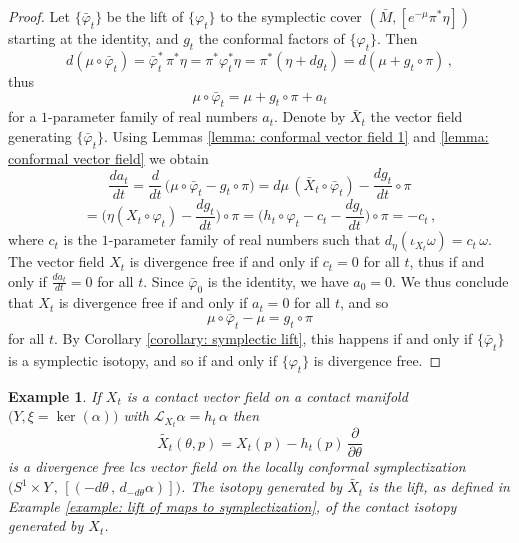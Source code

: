 \documentclass{amsart}
\newtheorem{example}[thm]{Example}
\theoremstyle{remark}
\begin{document}
\begin{proof}
Let $\{\bar{\varphi}_t\}$ be the lift of $\{\varphi_t\}$
to the symplectic cover $(\bar{M}, [e^{-\mu} \pi^{\ast}\eta])$
starting at the identity,
and $g_t$ the conformal factors of $\{\varphi_t\}$.
Then
\[
d (\mu \circ \bar{\varphi}_t)
= \bar{\varphi}_t^{\ast} \, \pi^{\ast} \eta
= \pi^{\ast} \varphi_t^{\ast} \eta
= \pi^{\ast} (\eta + dg_t)
= d (\mu + g_t \circ \pi) \,,
\]
thus
\[
\mu \circ \bar{\varphi}_t = \mu + g_t \circ \pi + a_t
\]
for a $1$-parameter family of real numbers $a_t$.
Denote by $\bar{X}_t$
the vector field generating $\{\bar{\varphi}_t\}$.
Using Lemmas \ref{lemma: conformal vector field 1}
and \ref{lemma: conformal vector field}
we obtain
\[
\frac{da_t}{dt}
= \frac{d}{dt} \, \big( \mu \circ \bar{\varphi}_t - g_t \circ \pi \big)
= d\mu \, (\bar{X}_t \circ \bar{\varphi}_t) - \frac{dg_t}{dt} \circ \pi
\]
\[
= \Big( \eta (X_t \circ \varphi_t) - \frac{dg_t}{dt} \Big) \circ \pi
= \Big(h_t \circ \varphi_t - c_t - \frac{dg_t}{dt} \Big) \circ \pi
= -c_t \,,
\]
where $c_t$ is the $1$-parameter family of real numbers
such that $d_{\eta} (\iota_{X_t}\omega) = c_t \, \omega$.
The vector field $X_t$ is divergence free
if and only if $c_t = 0$ for all $t$,
thus if and only if $\frac{d a_t}{dt} = 0$ for all $t$.
Since $\bar{\varphi}_0$ is the identity,
we have $a_0 = 0$.
We thus conclude that $X_t$ is divergence free
if and only if $a_t = 0$ for all $t$,
and so
\[
\mu \circ \bar{\varphi}_t - \mu = g_t \circ \pi
\]
for all $t$.
By Corollary \ref{corollary: symplectic lift},
this happens if and only if
$\{\bar{\varphi}_t\}$ is a symplectic isotopy,
and so if and only if $\{\varphi_t\}$ is divergence free.
\end{proof}

\begin{example}\label{example: lift of isotopies to symplectization}
If $X_t$ is a contact vector field
on a contact manifold $\big(Y, \xi = \ker (\alpha)\big)$
with $\mathcal{L}_{X_t} \alpha = h_t \, \alpha$
then
\[
\widetilde{X_t} (\theta, p) = X_t(p) - h_t(p) \, \frac{\partial}{\partial \theta}
\]
is a divergence free lcs vector field
on the locally conformal symplectization
$\big(S^1 \times Y \,,\, [(-d\theta \,,\, d_{-d\theta} \alpha)] \big)$.
The isotopy generated by $\widetilde{X_t}$
is the lift,
as defined in Example \ref{example: lift of maps to symplectization},
of the contact isotopy generated by $X_t$.
\end{example}
\end{document}

